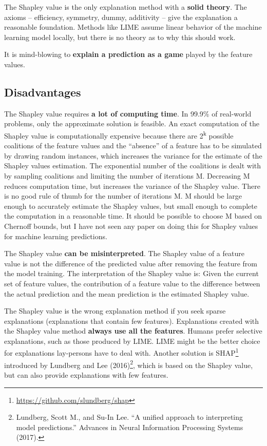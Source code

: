 \documentclass[
  11pt,
]{scrbook}
\renewcommand{\href}[2]{#2\footnote{\url{#1}}}
\begin{document}
The Shapley value is the only explanation method with a \textbf{solid theory}.
The axioms -- efficiency, symmetry, dummy, additivity -- give the explanation a reasonable foundation.
Methods like LIME assume linear behavior of the machine learning model locally, but there is no theory as to why this should work.

It is mind-blowing to \textbf{explain a prediction as a game} played by the feature values.

\hypertarget{disadvantages-16}{%
\subsection{Disadvantages}\label{disadvantages-16}}

The Shapley value requires \textbf{a lot of computing time}.
In 99.9\% of real-world problems, only the approximate solution is feasible.
An exact computation of the Shapley value is computationally expensive because there are 2\textsuperscript{k} possible coalitions of the feature values and the ``absence'' of a feature has to be simulated by drawing random instances, which increases the variance for the estimate of the Shapley values estimation.
The exponential number of the coalitions is dealt with by sampling coalitions and limiting the number of iterations M.
Decreasing M reduces computation time, but increases the variance of the Shapley value.
There is no good rule of thumb for the number of iterations M.
M should be large enough to accurately estimate the Shapley values, but small enough to complete the computation in a reasonable time.
It should be possible to choose M based on Chernoff bounds, but I have not seen any paper on doing this for Shapley values for machine learning predictions.

The Shapley value \textbf{can be misinterpreted}.
The Shapley value of a feature value is not the difference of the predicted value after removing the feature from the model training.
The interpretation of the Shapley value is:
Given the current set of feature values, the contribution of a feature value to the difference between the actual prediction and the mean prediction is the estimated Shapley value.

The Shapley value is the wrong explanation method if you seek sparse explanations (explanations that contain few features).
Explanations created with the Shapley value method \textbf{always use all the features}.
Humans prefer selective explanations, such as those produced by LIME.
LIME might be the better choice for explanations lay-persons have to deal with.
Another solution is \href{https://github.com/slundberg/shap}{SHAP} introduced by Lundberg and Lee (2016)\footnote{Lundberg, Scott M., and Su-In Lee. ``A unified approach to interpreting model predictions.'' Advances in Neural Information Processing Systems (2017).}, which is based on the Shapley value, but can also provide explanations with few features.
\end{document}
